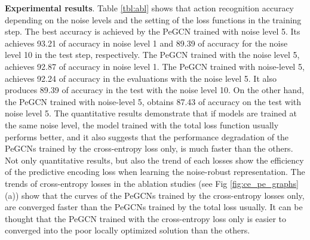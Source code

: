 \documentclass[runningheads]{llncs}
\begin{document}
\textbf{Experimental results}. Table \ref{tbl:abl} shows that action recognition accuracy depending on the noise levels and the setting of the loss functions in the training step. The best accuracy is achieved by the PeGCN trained with noise level 5. Its achieves 93.21 of accuracy in noise level 1 and 89.39 of accuracy for the noise level 10  in the test step, respectively. The PeGCN trained with the noise level 5, achieves 92.87 of accuracy in noise level 1. The PeGCN trained with noise-level 5, achieves 92.24 of accuracy in the evaluations with the noise level 5. It also produces 89.39 of accuracy in the test with the noise level 10. On the other hand, the PeGCN trained with noise-level 5, obtains 87.43 of accuracy on the test with noise level 5. The quantitative results demonstrate that if models are trained at the same noise level, the model trained with the total loss function  usually performs better, and it also suggests that the performance degradation of the PeGCNs trained by the cross-entropy loss only, is much faster than the others.  Not only quantitative results, but also the trend of each losses show the efficiency of the predictive encoding loss when learning the noise-robust representation. The trends of cross-entropy losses in the ablation studies (see Fig \ref{fig:ce_pe_graphs}(a)) show that the curves of the PeGCNs trained by the cross-entropy losses only, are converged faster than the PeGCNs trained by the total loss  usually. It can be thought that the PeGCN trained with the cross-entropy loss only is easier to converged into the poor locally optimized solution than the others. 
\end{document}
